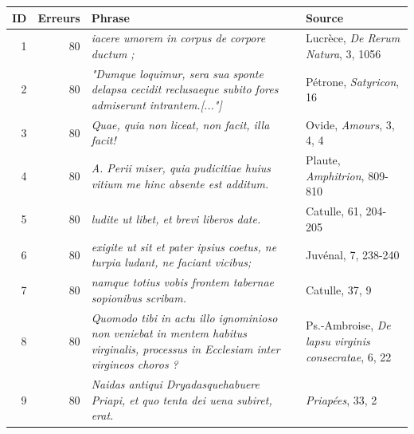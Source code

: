 \begin{table}[]
    \centering
    \small %
    \begin{tabularx}{\textwidth}{|r|r|X|X|}
    \toprule
    ID & Erreurs & Phrase & Source                                                                                                                                   \\ \midrule
    1     & 80               & \textit{iacere umorem in corpus de corpore ductum ;}  & Lucrèce, \textit{De Rerum Natura}, 3, 1056                                                                                              \\
    2     & 80               & \textit{"Dumque loquimur, sera sua sponte delapsa cecidit reclusaeque subito fores admiserunt intrantem.{[..."]}} & Pétrone, \textit{Satyricon}, 16                            \\
    3     & 80               & \textit{Quae, quia non liceat, non facit, illa facit!} & Ovide, \textit{Amours}, 3, 4, 4                                                                                       \\
    4     & 80               & \textit{A. Perii miser, quia pudicitiae huius vitium me hinc absente est additum.}  & Plaute, \textit{Amphitrion}, 809-810                                                             \\
    5     & 80               & \textit{ludite ut libet, et brevi liberos date.}  & Catulle, 61, 204-205                                                                                                \\
    6     & 80               & \textit{exigite ut sit et pater ipsius coetus, ne turpia ludant, ne faciant vicibus;}   & Juvénal, 7, 238-240                                                        \\
    7     & 80               & \textit{namque totius vobis frontem tabernae sopionibus scribam.}   & Catulle, 37, 9                                                                              \\
    8     & 80               & \textit{Quomodo tibi in actu illo ignominioso non veniebat in mentem habitus virginalis, processus in Ecclesiam inter virgineos choros ?} & Ps.-Ambroise, \textit{De lapsu virginis consecratae}, 6, 22         \\
    9     & 80               & \textit{Naidas antiqui Dryadasquehabuere Priapi, et quo tenta dei uena subiret, erat.}  & \textit{Priapées}, 33, 2                                                  \\

\end{tabularx}
\end{table}
